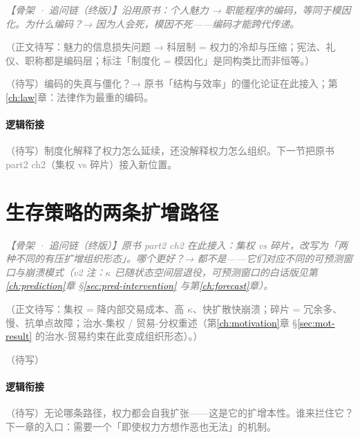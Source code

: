 \documentclass[../../main2.tex]{subfiles}
\begin{document}
	\textcolor{gray}{\textit{【骨架 · 追问链（终版）】沿用原书：个人魅力 → 职能程序的编码，等同于模因化。为什么编码？→ 因为人会死，模因不死——编码才能跨代传递。}}

	\textcolor{gray}{（正文待写：魅力的信息损失问题 → 科层制 = 权力的冷却与压缩；宪法、礼仪、职称都是编码层；\lowfreq 标注「制度化 = 模因化」是同构类比而非恒等。）}

	\begin{reader_anticipation}
		\item \textcolor{gray}{（待写）编码的失真与僵化？→ 原书「结构与效率」的僵化论证在此接入；第\ref{ch:law}章：法律作为最重的编码。}
	\end{reader_anticipation}

	\paragraph*{逻辑衔接}
	\textcolor{gray}{（待写）制度化解释了权力怎么延续，还没解释权力怎么组织。下一节把原书 part2 ch2（集权 vs 碎片）接入新位置。}

	\section{生存策略的两条扩增路径}
	\label{sec:pol-two-paths}

	\textcolor{gray}{\textit{【骨架 · 追问链（终版）】原书 part2 ch2 在此接入：集权 vs 碎片，改写为「两种不同的有压扩增组织形态」。哪个更好？→ 都不是——它们对应不同的可预测窗口与崩溃模式（v2 注：$\kappa$ 已随状态空间层退役，可预测窗口的白话版见第\ref{ch:prediction}章 §\ref{sec:pred-intervention} 与第\ref{ch:forecast}章）。}}

	\textcolor{gray}{（正文待写：集权 = 降内部交易成本、高 $\kappa$、快扩散快崩溃；碎片 = 冗余多、慢、抗单点故障；治水-集权 / 贸易-分权重述（第\ref{ch:motivation}章 §\ref{sec:mot-result} 的治水-贸易约束在此变成组织形态）。）}

	\begin{readingnote}
		\textcolor{gray}{（待写）}
	\end{readingnote}

	\paragraph*{逻辑衔接}
	\textcolor{gray}{（待写）无论哪条路径，权力都会自我扩张——这是它的扩增本性。谁来拦住它？下一章的入口：需要一个「即使权力方想作恶也无法」的机制。}
\end{document}
